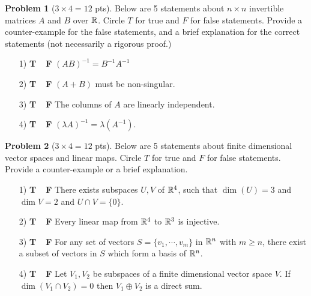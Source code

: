 \documentclass[12pt]{amsart}
\theoremstyle{definition}
\newtheorem{prob}{Problem}
\begin{document}
\begin{prob}[$3\times 4 = 12$ pts]
	Below are 5 statements about $n\times n$ invertible matrices $A$ and $B$ over $\mathbb{R}$. Circle $T$ for true and $F$ for false statements. Provide a counter-example for the false statements, and a brief explanation for the correct statements (not necessarily a rigorous proof.) \begin{enumerate}
	\item[1)  {\bf T\ \  F}]\quad $(AB)^{-1}=B^{-1}A^{-1}$
	
	\vspace{4cm}
	\item[2)  {\bf T\ \  F}]\quad  $(A+B)$ must be non-singular. \vspace{5cm}
	\item[3)  {\bf T\ \  F}]\quad The columns of $A$ are linearly independent. \vspace{5cm}
	\item[4)  {\bf T\ \  F}]\quad $(\lambda A)^{-1}=\lambda (A^{-1})$.
\end{enumerate}
\end{prob}
\newpage
\begin{prob}[$3\times 4 = 12$ pts]
	Below are 5 statements about finite dimensional vector spaces and linear maps. Circle $T$ for true and $F$ for false statements. Provide a counter-example or a brief explanation.
	\begin{enumerate}
		\item[1)  {\bf T\ \  F}]\quad There exists subspaces $U,V$ of $\mathbb{R}^4$, such that $\dim(U)=3$ and $\dim V=2$ and $U\cap V=\{0\}$. 
		\vspace{5cm}
\item[2)  {\bf T\ \  F}]\quad  Every linear map from $\mathbb{R}^4$ to $\mathbb{R}^3$ is injective.\vspace{5cm}
\item[3)  {\bf T\ \  F}]\quad  For any set of vectors $S=\{v_1,\cdots,v_m\}$ in $\mathbb{R}^n$ with $m\geq n$, there exist a subset of vectors in $S$ which form a basis of $\mathbb{R}^n$.\vspace{5cm}
\item[4)  {\bf T\ \  F}]\quad  Let $V_1,V_2$ be subspaces of a finite dimensional vector space $V$. If $\dim(V_1\cap V_2)=0$ then $V_1\oplus V_2$ is a direct sum.
	\end{enumerate}
\end{prob}
\newpage
\end{document}
